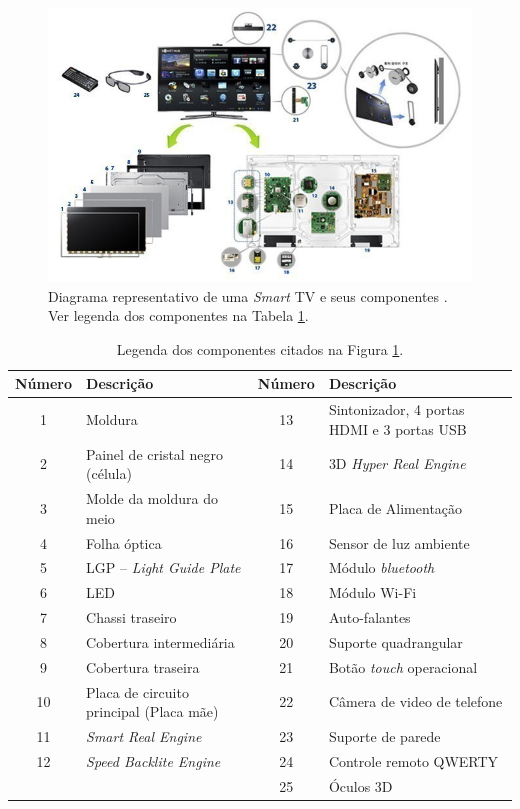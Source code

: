 \begin{figure}[h!]
	\includegraphics[width=\textwidth]{img/smart_samsung.jpg}
	\caption{Diagrama representativo de uma \emph{Smart} TV e seus componentes \cite{samsung:smarttv}. Ver legenda dos componentes na Tabela \ref{tab:smart}.}
	\label{fig:smart_samsung}
\end{figure}

\begin{table}[h!]
	\centering
	\caption{Legenda dos componentes citados na Figura \ref{fig:smart_samsung}.}
	\label{tab:smart}
	\begin{tabular}{c l  c l}
		\toprule
		\textbf{Número} & \textbf{Descrição} & \textbf{Número} & \textbf{Descrição}\\
		\midrule
		1 & Moldura & 13 & Sintonizador, 4 portas HDMI e 3 portas USB \\
		2 & Painel de cristal negro (célula) & 14 & 3D \emph{Hyper Real Engine}\\
		3 & Molde da moldura do meio & 15 & Placa de Alimentação \\
		4 & Folha óptica & 16 & Sensor de luz ambiente\\
		5 & LGP -- \emph{Light Guide Plate} & 17 &  Módulo \emph{bluetooth} \\
		6 & LED & 18 & Módulo Wi-Fi\\
		7 & Chassi traseiro & 19 & Auto-falantes \\
		8 & Cobertura intermediária & 20 & Suporte quadrangular\\
		9 & Cobertura traseira & 21 & Botão \emph{touch} operacional\\
		10 & Placa de circuito principal (Placa mãe) & 22 & Câmera de video de telefone\\
		11 & \emph{Smart Real Engine} & 23 & Suporte de parede \\
		12 & \emph{Speed Backlite Engine} & 24 & Controle remoto QWERTY\\
		   &  & 25 & Óculos 3D \\
		\bottomrule
	\end{tabular}
\end{table}

